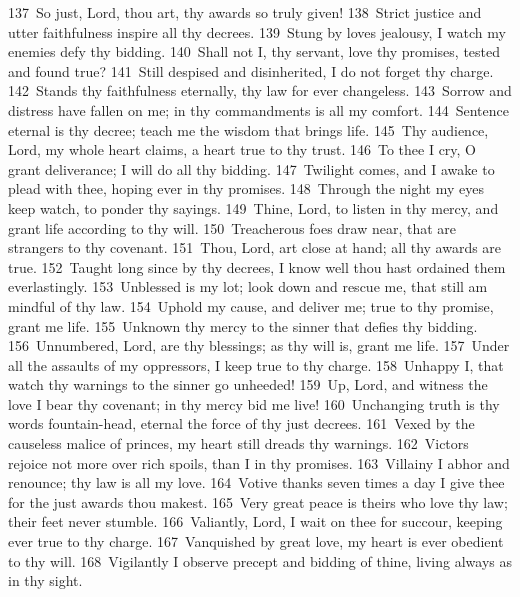 \documentclass[10pt]{book} %
\begin{document}
\textcolor{benred8}{137}~So just, Lord, thou art, thy awards so truly given! \textcolor{benred8}{138}~Strict justice and utter faithfulness inspire all thy decrees. \textcolor{benred8}{139}~Stung by love\textquotesingle s jealousy, I watch my enemies defy thy bidding. \textcolor{benred8}{140}~Shall not I, thy servant, love thy promises, tested and found true? \textcolor{benred8}{141}~Still despised and disinherited, I do not forget thy charge. \textcolor{benred8}{142}~Stands thy faithfulness eternally, thy law for ever changeless. \textcolor{benred8}{143}~Sorrow and distress have fallen on me; in thy commandments is all my comfort. \textcolor{benred8}{144}~Sentence eternal is thy decree; teach me the wisdom that brings life.
\textcolor{benred8}{145}~Thy audience, Lord, my whole heart claims, a heart true to thy trust. \textcolor{benred8}{146}~To thee I cry, O grant deliverance; I will do all thy bidding. \textcolor{benred8}{147}~Twilight comes, and I awake to plead with thee, hoping ever in thy promises. \textcolor{benred8}{148}~Through the night my eyes keep watch, to ponder thy sayings. \textcolor{benred8}{149}~Thine, Lord, to listen in thy mercy, and grant life according to thy will. \textcolor{benred8}{150}~Treacherous foes draw near, that are strangers to thy covenant. \textcolor{benred8}{151}~Thou, Lord, art close at hand; all thy awards are true. \textcolor{benred8}{152}~Taught long since by thy decrees, I know well thou hast ordained them everlastingly.
\textcolor{benred8}{153}~Unblessed is my lot; look down and rescue me, that still am mindful of thy law. \textcolor{benred8}{154}~Uphold my cause, and deliver me; true to thy promise, grant me life. \textcolor{benred8}{155}~Unknown thy mercy to the sinner that defies thy bidding. \textcolor{benred8}{156}~Unnumbered, Lord, are thy blessings; as thy will is, grant me life. \textcolor{benred8}{157}~Under all the assaults of my oppressors, I keep true to thy charge. \textcolor{benred8}{158}~Unhappy I, that watch thy warnings to the sinner go unheeded! \textcolor{benred8}{159}~Up, Lord, and witness the love I bear thy covenant; in thy mercy bid me live! \textcolor{benred8}{160}~Unchanging truth is thy word\textquotesingle s fountain-head, eternal the force of thy just decrees.
\textcolor{benred8}{161}~Vexed by the causeless malice of princes, my heart still dreads thy warnings. \textcolor{benred8}{162}~Victors rejoice not more over rich spoils, than I in thy promises. \textcolor{benred8}{163}~Villainy I abhor and renounce; thy law is all my love. \textcolor{benred8}{164}~Votive thanks seven times a day I give thee for the just awards thou makest. \textcolor{benred8}{165}~Very great peace is theirs who love thy law; their feet never stumble. \textcolor{benred8}{166}~Valiantly, Lord, I wait on thee for succour, keeping ever true to thy charge. \textcolor{benred8}{167}~Vanquished by great love, my heart is ever obedient to thy will. \textcolor{benred8}{168}~Vigilantly I observe precept and bidding of thine, living always as in thy sight.
\end{document}
